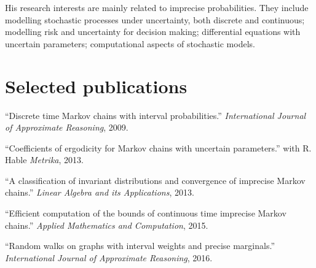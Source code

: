 \documentclass[overlapped,line,letterpaper]{res}
\begin{document}
\begin{resume}
		His research interests are mainly related to imprecise probabilities. They include modelling stochastic processes under uncertainty, both discrete and continuous; modelling risk and uncertainty for decision making; differential equations with uncertain parameters; computational aspects of stochastic models.  
		
		
		
		
		
			
		\section{\bf Selected publications}
		
		``Discrete time Markov chains with interval probabilities.'' {\em International Journal of Approximate Reasoning}, 2009.
		
		``Coefficients of ergodicity for Markov chains with uncertain parameters.'' with R. Hable  {\em Metrika}, 2013.
		
		``A classification of invariant distributions and convergence of imprecise Markov chains.''  {\em  Linear Algebra and its Applications}, 2013.
		
		``Efficient computation of the bounds of continuous time imprecise Markov chains.'' {\em  Applied Mathematics and Computation}, 2015. 
		
		``Random walks on graphs with interval weights and precise marginals.'' {\em International Journal of Approximate Reasoning}, 2016.		
	\end{resume}
	
\end{document}
